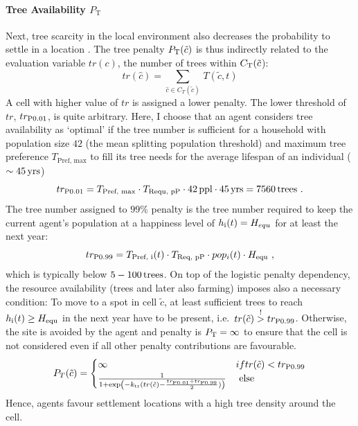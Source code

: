\paragraph{Tree Availability $P_\text{T}$}
Next, tree scarcity in the local environment also decreases the probability to settle in a location .
The tree penalty $P_{\rm T}(\tilde{c})$ is thus indirectly related to the evaluation variable $tr(c)$, the number of trees within $C_{\rm T}(\tilde{c}$):
\begin{equation}
	tr(\hat{c}) = \sum_{\hat{c} \in C_T(\tilde{c})}\, T(\tilde{c},t)
\end{equation}
A cell with higher value of $tr$ is assigned a lower penalty.
The lower threshold of $tr$, $tr_{\rm P0.01}$, is quite arbitrary.
Here, I choose that an agent considers tree availability as `optimal' if the tree number is sufficient for a household with population size $42$ (the mean splitting population threshold) and maximum tree preference $T_\text{Pref, max}$ to fill its tree needs for the average lifespan of an individual ($\sim 45\, {\rm yrs}$)
\begin{equation}
tr_{\rm P0.01} = T_\text{Pref, max} \cdot T_\text{Requ, pP} \cdot 42 \, {\rm ppl} \cdot 45\, {\rm yrs} = 7560 \, {\rm trees} \ .
\end{equation}
The tree number assigned to $99\%$ penalty is the tree number required to keep the current agent's population at a happiness level of $h_{\rm i}(t) = H_{equ}$ for at least the next year:
\begin{equation}%
tr_{\rm P0.99} = T_\text{Pref, i}(t) \cdot T_\text{Req, pP} \cdot pop_i(t) \cdot H_\text{equ} \ ,
\end{equation}
which is typically below $5-100\, {\rm trees}$.
On top of the logistic penalty dependency, the resource availability (trees and later also farming) imposes also a necessary condition:
To move to a spot in cell $\tilde{c}$, at least sufficient trees to reach $h_{\rm i}(t)\geq H_{\rm equ}$ in the next year have to be present, i.e.\ $tr(\tilde{c}) \stackrel{!}{>} tr_{\rm P0.99}$. Otherwise, the site is avoided by the agent and penalty is $P_{\rm T}= \infty$ to ensure that the cell is not considered even if all other penalty contributions are favourable.
\begin{equation}
P_T(\tilde{c}) = 
\begin{cases} \infty & { if }tr(\tilde{c})< tr_{\rm P0.99} \\
\frac{1}{1+\exp\left( - k_{\rm tr} (tr(\tilde{c})-\frac{tr_{\rm P0.01}+tr_{\rm P0.99}}{2}) \right)} & \text{ else }
\end{cases}
\end{equation}
Hence, agents favour settlement locations with a high tree density around the cell.


